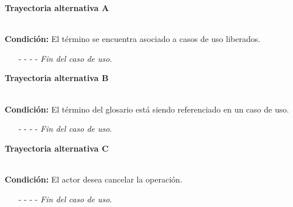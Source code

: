 \hypertarget{CU6-3:TAA}{\textbf{Trayectoria alternativa A}}\\
\noindent \textbf{Condición:} El término se encuentra asociado a casos de uso liberados.
\begin{enumerate}
	\UCpaso[\UCsist] Oculta el botón \eliminar del término que esta asociado a casos de uso liberados.
	\item[- -] - - {\em {Fin del caso de uso}}.
\end{enumerate}
\hypertarget{CU6-3:TAB}{\textbf{Trayectoria alternativa B}}\\
\noindent \textbf{Condición:} El término del glosario está siendo referenciado en un caso de uso.
\begin{enumerate}
	\UCpaso[\UCsist] Muestra el mensaje  en la pantalla  en una pantalla emergente con la lista de casos de uso que están referenciando al término del glosario.
	\UCpaso[\UCactor] Oprime el botón  de la pantalla emergente.
	\UCpaso[\UCsist] Muestra la pantalla .
	\item[- -] - - {\em {Fin del caso de uso}}.
\end{enumerate}
\hypertarget{CU6-3:TAC}{\textbf{Trayectoria alternativa C}}\\
\noindent \textbf{Condición:} El actor desea cancelar la operación.
\begin{enumerate}
	\UCpaso[\UCactor] Oprime el botón  de la pantalla emergente.
	\UCpaso[\UCsist] Muestra la pantalla .
	\item[- -] - - {\em {Fin del caso de uso}}.%
\end{enumerate}	

